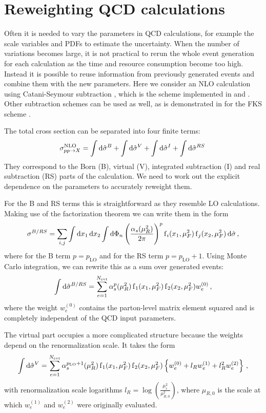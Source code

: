 \section{Reweighting QCD calculations}
Often it is needed to vary the parameters in QCD calculations, for example the scale variables and PDFs to estimate the uncertainty.
When the number of variations becomes large, it is not practical to rerun the whole event generation for each calculation as the time and resource consumption become too high.
Instead it is possible to reuse information from previously generated events and combine them with the new parameters.
Here we consider an NLO calculation using Catani-Seymour subtraction \cite{catani_seymour1997}, which is the scheme implemented in \sherpa{} and \mcgrid{}.
Other subtraction schemes can be used as well, as is demonstrated in \cite{amcfast} for the FKS scheme \cite{fks_a,fks_b}.

The total cross section can be separated into four finite terms:
%
\begin{equation}
	\sigma^\text{NLO}_{pp \rightarrow X} = \int \dif \hat \sigma^B + \int \dif \hat \sigma^V + \int \dif \hat \sigma^I + \int \dif \hat \sigma^{RS} \,
\end{equation}
%
They correspond to the Born (B), virtual (V), integrated subtraction (I) and real subtraction (RS) parts of the calculation.
We need to work out the explicit dependence on the parameters to accurately reweight them.

For the B and RS terms this is straightforward as they resemble LO calculations.
Making use of the factorization theorem we can write them in the form
%
\begin{equation}
	\sigma^{B/RS} = \sum_{i,j} \int \dif x_1 \dif x_2 \int \dif \Phi_n \left( \frac{\alpha_s(\mu_R^2)}{2 \pi} \right)^p \pdf_i(x_1,\mu_F^2) \pdf_j(x_2,\mu_F^2) \dif \hat\sigma \, ,
\end{equation}
%
where for the B term $p = p_\text{LO}$ and for the RS term $p = p_\text{LO} + 1$.
Using Monte Carlo integration, we can rewrite this as a sum over generated events:
%
\begin{equation}
  \int \dif \hat \sigma^{B/RS} = \sum_{e=1}^{N_\text{evt}} \alpha_s^p(\mu_R^2) \pdf_1(x_1,\mu_F^2) \pdf_2(x_2,\mu_F^2) w_e^{(0)} \, ,
  \label{eq:reweight_lo}
\end{equation}
%
where the weight $w_e^{(0)}$ contains the parton-level matrix element squared and is completely independent of the QCD input parameters.

The virtual part occupies a more complicated structure because the weights depend on the renormalization scale.
It takes the form
%
\begin{equation}
	\int \dif \hat \sigma^V = \sum_{e=1}^{N_\text{evt}} \alpha_s^{p_\text{LO} + 1}(\mu_R^2) \pdf_1(x_1,\mu_F^2) \pdf_2(x_2,\mu_F^2) \left\{ w_e^{(0)} + l_R w_e^{(1)} + l_R^2 w_e^{(2)} \right\} \, ,
\end{equation}
%
with renormalization scale logarithms $l_R = \log\left(\frac{\mu_r^2}{\mu_{R,0}^2} \right)$, where $\mu_{R,0}$ is the scale at which $w_e^{(1)}$ and $w_e^{(2)}$ were originally evaluated.

